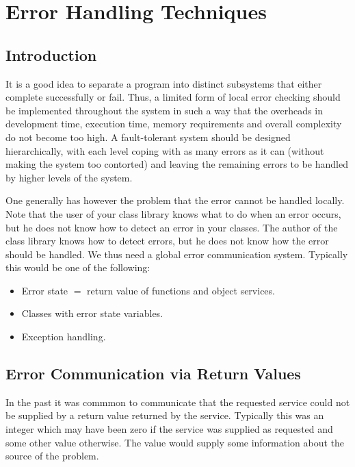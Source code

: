 %

\chapter{Error Handling Techniques\label{chapErrorhnd}}

 

\section{Introduction}

It is a good idea to separate a program into distinct subsystems that
either complete successfully or fail. Thus, a limited form of local error 
checking should be implemented throughout the system in such a way
that the overheads in development time, execution time, memory 
requirements and overall complexity do not become too high. A
fault-tolerant system should be designed hierarchically, with each
level coping with as many errors as it can (without making the system
too contorted) and leaving the remaining errors to be handled by
higher levels of the system. 

One generally has however the problem that the error cannot be handled
locally. Note that the user of your class library knows what to do when an
error occurs, but he does not know how to detect an error in your classes.
The author of the class library knows how to detect errors, but he does not
know how the error should be handled. We thus need a global error
communication system. Typically this would be one of the following:
\begin{itemize}
   \item Error state $=$ return value of functions and object services.
   \item Classes with error state variables.
   \item Exception handling.
\end{itemize}



\section{Error Communication via Return Values}

In the past it was commmon to communicate that the requested service could 
not be supplied by a return value returned by the service. Typically this 
was an integer which may have been zero if the service was supplied as 
requested and some other value otherwise. The value would supply some
information about the source of the problem.

